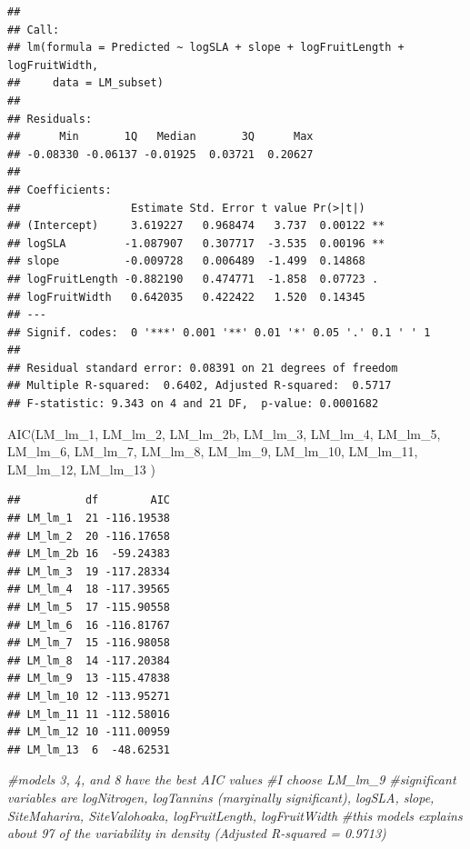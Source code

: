\documentclass[
  12pt,
]{article}
\newenvironment{Shaded}{\begin{snugshade}}{\end{snugshade}}
\newcommand{\CommentTok}[1]{\textcolor[rgb]{0.56,0.35,0.01}{\textit{#1}}}
\newcommand{\FunctionTok}[1]{\textcolor[rgb]{0.00,0.00,0.00}{#1}}
\newcommand{\NormalTok}[1]{#1}
\begin{document}
\begin{verbatim}
## 
## Call:
## lm(formula = Predicted ~ logSLA + slope + logFruitLength + logFruitWidth, 
##     data = LM_subset)
## 
## Residuals:
##      Min       1Q   Median       3Q      Max 
## -0.08330 -0.06137 -0.01925  0.03721  0.20627 
## 
## Coefficients:
##                 Estimate Std. Error t value Pr(>|t|)   
## (Intercept)     3.619227   0.968474   3.737  0.00122 **
## logSLA         -1.087907   0.307717  -3.535  0.00196 **
## slope          -0.009728   0.006489  -1.499  0.14868   
## logFruitLength -0.882190   0.474771  -1.858  0.07723 . 
## logFruitWidth   0.642035   0.422422   1.520  0.14345   
## ---
## Signif. codes:  0 '***' 0.001 '**' 0.01 '*' 0.05 '.' 0.1 ' ' 1
## 
## Residual standard error: 0.08391 on 21 degrees of freedom
## Multiple R-squared:  0.6402, Adjusted R-squared:  0.5717 
## F-statistic: 9.343 on 4 and 21 DF,  p-value: 0.0001682
\end{verbatim}

\begin{Shaded}
\begin{Highlighting}[]
\FunctionTok{AIC}\NormalTok{(LM\_lm\_1, LM\_lm\_2, LM\_lm\_2b, LM\_lm\_3, LM\_lm\_4, LM\_lm\_5, LM\_lm\_6, LM\_lm\_7, LM\_lm\_8, LM\_lm\_9, LM\_lm\_10, LM\_lm\_11, LM\_lm\_12, LM\_lm\_13 )}
\end{Highlighting}
\end{Shaded}

\begin{verbatim}
##          df        AIC
## LM_lm_1  21 -116.19538
## LM_lm_2  20 -116.17658
## LM_lm_2b 16  -59.24383
## LM_lm_3  19 -117.28334
## LM_lm_4  18 -117.39565
## LM_lm_5  17 -115.90558
## LM_lm_6  16 -116.81767
## LM_lm_7  15 -116.98058
## LM_lm_8  14 -117.20384
## LM_lm_9  13 -115.47838
## LM_lm_10 12 -113.95271
## LM_lm_11 11 -112.58016
## LM_lm_12 10 -111.00959
## LM_lm_13  6  -48.62531
\end{verbatim}

\begin{Shaded}
\begin{Highlighting}[]
\CommentTok{\#models 3, 4, and 8 have the best AIC values}
\CommentTok{\#I choose LM\_lm\_9}
\CommentTok{\#significant variables are logNitrogen, logTannins (marginally significant), logSLA, slope, SiteMaharira, SiteValohoaka, logFruitLength, logFruitWidth}
\CommentTok{\#this models explains about 97 of the variability in density (Adjusted R{-}squared = 0.9713)}
\end{Highlighting}
\end{Shaded}
\end{document}
